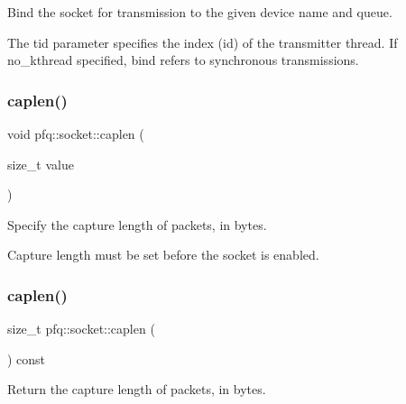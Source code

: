 Bind the socket for transmission to the given device name and queue. 

The tid parameter specifies the index (id) of the transmitter thread. If \textquotesingle{}no\+\_\+kthread\textquotesingle{} specified, bind refers to synchronous transmissions. \mbox{\label{classpfq_1_1socket_ab68dbba5ef01041b9c96758c4a9f0a6c}} 
\subsubsection{\texorpdfstring{caplen()}{caplen()}\hspace{0.1cm}{\footnotesize\ttfamily [1/2]}}
{\footnotesize\ttfamily void pfq\+::socket\+::caplen (\begin{DoxyParamCaption}\item[{size\+\_\+t}]{value }\end{DoxyParamCaption})\hspace{0.3cm}{\ttfamily [inline]}}



Specify the capture length of packets, in bytes. 

Capture length must be set before the socket is enabled. \mbox{\label{classpfq_1_1socket_aa0052a8337748212d02fadb229d71108}} 
\subsubsection{\texorpdfstring{caplen()}{caplen()}\hspace{0.1cm}{\footnotesize\ttfamily [2/2]}}
{\footnotesize\ttfamily size\+\_\+t pfq\+::socket\+::caplen (\begin{DoxyParamCaption}{ }\end{DoxyParamCaption}) const\hspace{0.3cm}{\ttfamily [inline]}}



Return the capture length of packets, in bytes. 

\mbox{\label{classpfq_1_1socket_a4c179188ea8fceeb5fd47d52f93c6bda}} 
